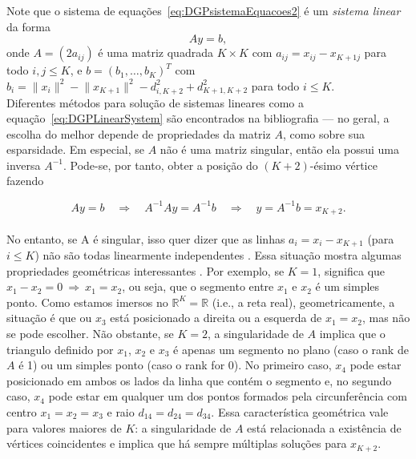 Note que o sistema de equações~\ref{eq:DGPsistemaEquacoes2} é um \textit{sistema linear} da forma 
\begin{equation}
	Ay=b,
	\label{eq:DGPLinearSystem}
\end{equation}
onde $A = (2a_{ij})$ é uma matriz quadrada $K \times K$ com $a_{ij} = x_{ij} - x_{K+1j}$ para todo $i,j \leq K$, e $b = (b_1, \dots, b_{K})^T$ com $b_i = \lVert x_i\rVert^2 - \lVert x_{K+1}\rVert^2 - d^2_{i,K+2} + d^2_{K+1,K+2}$ para todo $i\leq K$. 
\\

Diferentes métodos para solução de sistemas lineares como a equação~\ref{eq:DGPLinearSystem} são encontrados na bibliografia \cite{AlgebraLinearElon} --- no geral, a escolha do melhor depende de propriedades da matriz $A$, como sobre sua esparsidade. Em especial, se $A$ não é uma matriz singular, então ela possui uma inversa $A^{-1}$. Pode-se, por tanto, obter a posição do $(K+2)$-ésimo vértice fazendo

\begin{equation}
	Ay = b \quad \Rightarrow \quad A^{-1}Ay = A^{-1}b \quad \Rightarrow \quad y = A^{-1}b = x_{K+2}.
\end{equation}
\\

No entanto, se A é singular, isso quer dizer que as linhas $a_i = x_i - x_{K+1}$ (para $i\leq K$) não são todas linearmente independentes \cite{AlgebraLinearElon}. Essa situação mostra algumas propriedades geométricas interessantes \cite{libertiEDG}. Por exemplo, se $K=1$, significa que $x_1 - x_2 = 0 \ \Rightarrow \  x_1 = x_2$, ou seja, que o segmento entre $x_1$ e $x_2$ é um simples ponto. Como estamos imersos no $\mathbb{R}^{K} = \mathbb{R}$ (i.e., a reta real), geometricamente, a situação é que ou $x_3$ está posicionado a direita ou a esquerda de $x_1 = x_2$, mas não se pode escolher. Não obstante, se $K = 2$, a singularidade de $A$ implica que o triangulo definido por $x_1$, $x_2$ e $x_3$ é apenas um segmento no plano (caso o rank de $A$ é 1) ou um simples ponto (caso o rank for 0). No primeiro caso, $x_4$ pode estar posicionado em ambos os lados da linha que contém o segmento e, no segundo caso, $x_4$ pode estar em qualquer um dos pontos formados pela circunferência com centro $x_1 = x_2 = x_3$ e raio $d_{14} = d_{24} = d_{34}$. 
Essa característica geométrica vale para valores maiores de $K$: a singularidade de $A$ está relacionada a existência de vértices coincidentes e implica que há sempre múltiplas soluções para $x_{K+2}$.\\

